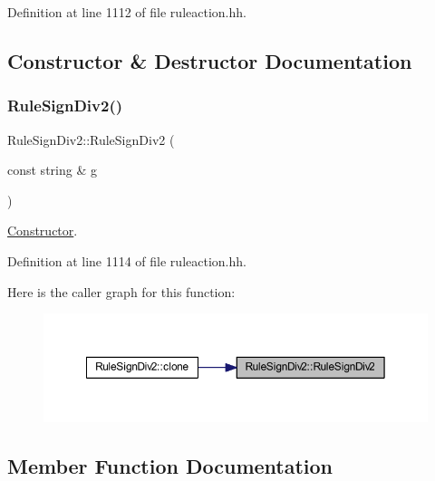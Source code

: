 Definition at line 1112 of file ruleaction.\+hh.



\subsection{Constructor \& Destructor Documentation}
\mbox{\label{class_rule_sign_div2_ab360d7b2a0e734fc488687cba904fec7}} 
\subsubsection{\texorpdfstring{RuleSignDiv2()}{RuleSignDiv2()}}
{\footnotesize\ttfamily Rule\+Sign\+Div2\+::\+Rule\+Sign\+Div2 (\begin{DoxyParamCaption}\item[{const string \&}]{g }\end{DoxyParamCaption})\hspace{0.3cm}{\ttfamily [inline]}}



\mbox{\hyperlink{class_constructor}{Constructor}}. 



Definition at line 1114 of file ruleaction.\+hh.

Here is the caller graph for this function\+:
\nopagebreak
\begin{figure}[H]
\begin{center}
\leavevmode
\includegraphics[width=350pt]{class_rule_sign_div2_ab360d7b2a0e734fc488687cba904fec7_icgraph}
\end{center}
\end{figure}


\subsection{Member Function Documentation}
\mbox{\label{class_rule_sign_div2_a2c19f27ad4e779fd9fc6a4bce1e16be5}} 
